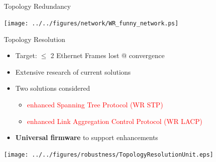 \documentclass[compress,red]{beamer}
\begin{document}
\subsection{}
\begin{frame}{Topology Redundancy}

      \begin{center}
	\texttt{[image: ../../figures/network/WR\_funny\_network.ps]}
      \end{center}

\end{frame}
\begin{frame}{Topology Resolution}

  \begin{itemize}
    \item Target: $\leq$ 2 Ethernet Frames lost @ convergence
    \item Extensive research of current solutions
    \item Two solutions considered
    \begin{itemize}
      \item \textcolor{red}{enhanced Spanning Tree Protocol (WR STP)}
      \item \textcolor{red}{enhanced Link Aggregation Control Protocol (WR LACP)}
    \end{itemize}
    \item {\bf Universal firmware} to support enhancements
  \end{itemize}

      \begin{center}
	\texttt{[image: ../../figures/robustness/TopologyResolutionUnit.eps]}
      \end{center}

\end{frame}
\end{document}
